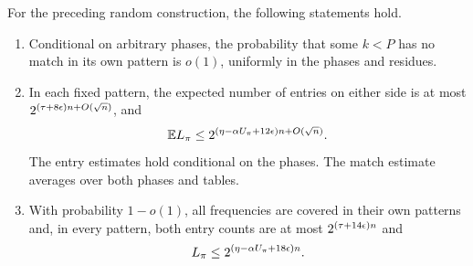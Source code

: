 \begin{lemma}
\label{lemma:checksum-tables}
For the preceding random construction, the following statements hold.
\begin{enumerate}[label=\textup{(\roman*)}]
\item Conditional on arbitrary phases, the probability that some
$k<P$ has no match in its own pattern is $o(1)$, uniformly in the
phases and residues.
\item In each fixed pattern, the expected number of entries on either
side is at most $2^{(\tau+8\epsilon)n+O(\sqrt n)}$, and
\begin{equation}
 \mathbb E L_\pi\le
 2^{(\eta-\alpha U_\pi+12\epsilon)n+O(\sqrt n)}.
 \label{eq:checksum-match-expectation}
\end{equation}
The entry estimates hold conditional on the phases.  The match
estimate averages over both phases and tables.
\item With probability $1-o(1)$, all frequencies are covered in their
own patterns and, in every pattern, both entry counts are at most
$2^{(\tau+14\epsilon)n}$ and
\begin{equation}
 L_\pi\le2^{(\eta-\alpha U_\pi+18\epsilon)n}.
 \label{eq:checksum-match-good}
\end{equation}
\end{enumerate}
\end{lemma}

